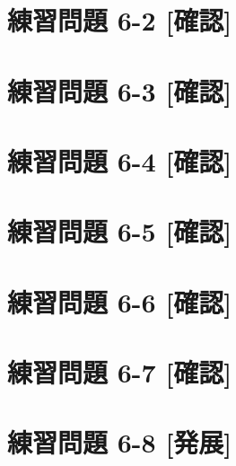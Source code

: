 \documentclass[
]{book}
\begin{document}
\hypertarget{ux7df4ux7fd2ux554fux984c-6-2-ux78baux8a8d}{%
\section*{練習問題 6-2 {[}確認{]}}\label{ux7df4ux7fd2ux554fux984c-6-2-ux78baux8a8d}}

\hypertarget{ux7df4ux7fd2ux554fux984c-6-3-ux78baux8a8d}{%
\section*{練習問題 6-3 {[}確認{]}}\label{ux7df4ux7fd2ux554fux984c-6-3-ux78baux8a8d}}

\hypertarget{ux7df4ux7fd2ux554fux984c-6-4-ux78baux8a8d}{%
\section*{練習問題 6-4 {[}確認{]}}\label{ux7df4ux7fd2ux554fux984c-6-4-ux78baux8a8d}}

\hypertarget{ux7df4ux7fd2ux554fux984c-6-5-ux78baux8a8d}{%
\section*{練習問題 6-5 {[}確認{]}}\label{ux7df4ux7fd2ux554fux984c-6-5-ux78baux8a8d}}

\hypertarget{ux7df4ux7fd2ux554fux984c-6-6-ux78baux8a8d}{%
\section*{練習問題 6-6 {[}確認{]}}\label{ux7df4ux7fd2ux554fux984c-6-6-ux78baux8a8d}}

\hypertarget{ux7df4ux7fd2ux554fux984c-6-7-ux78baux8a8d}{%
\section*{練習問題 6-7 {[}確認{]}}\label{ux7df4ux7fd2ux554fux984c-6-7-ux78baux8a8d}}

\hypertarget{ux7df4ux7fd2ux554fux984c-6-8-ux767aux5c55}{%
\section*{練習問題 6-8 {[}発展{]}}\label{ux7df4ux7fd2ux554fux984c-6-8-ux767aux5c55}}
\end{document}
